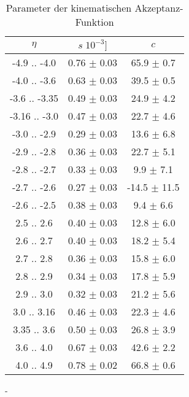 \begin{table}[h]
    \centering
    \begin{tabular}{|c|c|c|}
        \hline
        $\eta$ & $s \; 10^{-3}]$ & $c$  \\
        \hline \hline
        -4.9  .. -4.0  & 0.76 $\pm$ 0.03 &  65.9 $\pm$  0.7 \\
        -4.0  .. -3.6  & 0.63 $\pm$ 0.03 &  39.5 $\pm$  0.5 \\
        -3.6  .. -3.35 & 0.49 $\pm$ 0.03 &  24.9 $\pm$  4.2 \\
        -3.16 .. -3.0  & 0.47 $\pm$ 0.03 &  22.7 $\pm$  4.6 \\
        -3.0  .. -2.9  & 0.29 $\pm$ 0.03 &  13.6 $\pm$  6.8 \\
        -2.9  .. -2.8  & 0.36 $\pm$ 0.03 &  22.7 $\pm$  5.1 \\
        -2.8  .. -2.7  & 0.33 $\pm$ 0.03 &   9.9 $\pm$  7.1 \\
        -2.7  .. -2.6  & 0.27 $\pm$ 0.03 & -14.5 $\pm$ 11.5 \\
        -2.6  .. -2.5  & 0.38 $\pm$ 0.03 &   9.4 $\pm$  6.6 \\
        \hline\hline
         2.5  ..  2.6  & 0.40 $\pm$ 0.03 &  12.8 $\pm$  6.0 \\
         2.6  ..  2.7  & 0.40 $\pm$ 0.03 &  18.2 $\pm$  5.4 \\
         2.7  ..  2.8  & 0.36 $\pm$ 0.03 &  15.8 $\pm$  6.0 \\
         2.8  ..  2.9  & 0.34 $\pm$ 0.03 &  17.8 $\pm$  5.9 \\
         2.9  ..  3.0  & 0.32 $\pm$ 0.03 &  21.2 $\pm$  5.6 \\
         3.0  ..  3.16 & 0.46 $\pm$ 0.03 &  22.3 $\pm$  4.6 \\
         3.35 ..  3.6  & 0.50 $\pm$ 0.03 &  26.8 $\pm$  3.9 \\
         3.6  ..  4.0  & 0.67 $\pm$ 0.03 &  42.6 $\pm$  2.2 \\
         4.0  ..  4.9  & 0.78 $\pm$ 0.02 &  66.8 $\pm$  0.6 \\
         \hline
    \end{tabular}
    \caption{Parameter der kinematischen Akzeptanz-Funktion}
    \label{tab:acceptance_parameters}
\end{table}
         
    	 
    	 
    	 
	     
    	 
    	 
    	-
    	 
    
    	 
    	 
    	 
    	 
    	 
    	 
    	 
    	 
    	 
